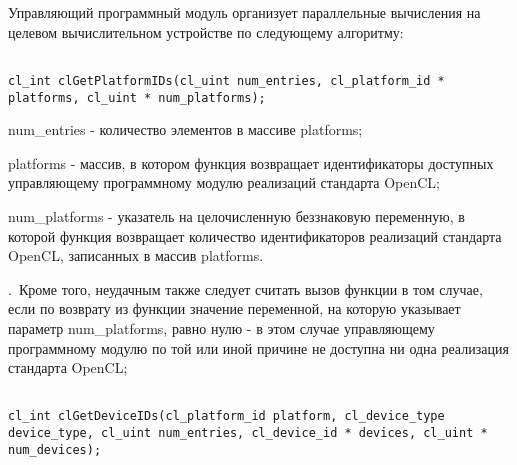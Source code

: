 
	Управляющий программный модуль организует параллельные вычисления на целевом вычислительном устройстве по следующему алгоритму:

	\begin{enumerate}



\begin{lstlisting}

cl_int clGetPlatformIDs(cl_uint num_entries, cl_platform_id * platforms, cl_uint * num_platforms);

\end{lstlisting}

		\openclend
		{
			\item num\_entries - количество элементов в массиве platforms;
			\item platforms - массив, в котором функция \openclfunc возвращает идентификаторы доступных управляющему программному модулю реализаций стандарта OpenCL;
			\item num\_platforms - указатель на целочисленную беззнаковую переменную, в которой функция \openclfunc возвращает количество идентификаторов реализаций стандарта OpenCL, записанных в массив platforms.
		}
		{\openclsuccess.~Кроме того, неудачным также следует считать вызов функции \openclfunc в том случае, если по возврату из функции значение переменной, на которую указывает параметр num\_platforms, равно нулю - в этом случае управляющему программному модулю по той или иной причине не доступна ни одна реализация стандарта OpenCL;}



\begin{lstlisting}

cl_int clGetDeviceIDs(cl_platform_id platform, cl_device_type device_type, cl_uint num_entries, cl_device_id * devices, cl_uint * num_devices);


\end{lstlisting}
\end{enumerate}
